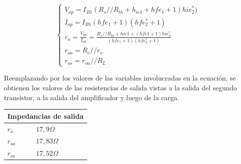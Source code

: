 	\begin{equation}
		\begin{cases}	
		V_{op}=I_{B1}( R_{s}//R_{th}+h_{ie1} + hfe_{1}+1)hie_{2}^{*}) \\
		I_{op}=I_{B1}(hfe_{1}+1)(hfe_{2}^{*}+1)\\
		r_{o}=\frac{V_{op}}{I_{op}}=\frac{R_{s}//R_{th}+hie1+(hfe1+1)hie_{2}^{*}}{(hfe_{1}+1)(hfe_{2}^{*}+1)}\\
		r_{oa}=R_{e}//r_{o}\\
		r_{os}=r_{oa}//R_{L}
		\end{cases}
		\label{mod_inc_ro}
	\end{equation}

Reemplazando por los valores de las variables involucradas en la ecuación, se obtienen los valores de las resistencias de salida vistas a la salida del segundo transistor, a la salida del amplificador y luego de la carga.

\begin{table}[H]
\centering
\begin{tabular}{ll}
\multicolumn{2}{l}{Impedancias de salida} \\ \hline
$r_o$                &   $17,9\Omega$        \\
$r_{oa}$              &  $17,83\Omega$      \\
$r_{os}$               &  $17,52\Omega$              
\end{tabular}
\end{table}
